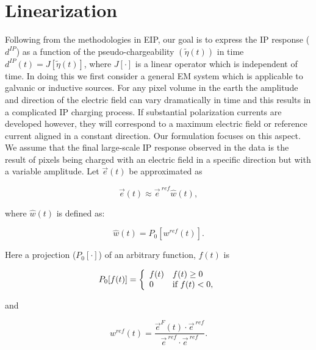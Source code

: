 \documentclass[extra,mreferee]{gji}
\newcommand {\e}  { {\vec e} }
\newcommand{\peta}{\tilde{\eta}}
\newcommand{\eref}{\e^{\ ref}}
\newcommand{\dip}{d^{IP}}
\begin{document}
\section{Linearization}
Following from the methodologies in EIP, our goal is to express the IP response ($\dip$) as a function of the pseudo-chargeability $(\peta(t))$ in time  $\dip(t) = J[\peta(t)]$, where $J[\cdot]$ is a linear operator which is independent of time. In doing this we first consider a general EM system which is applicable to galvanic or inductive sources. 
For any pixel  volume in the earth the amplitude and direction of the  electric field can vary dramatically  in time and this results in a complicated  IP charging process. If substantial polarization currents are developed however, they will correspond to a maximum electric field or reference current aligned in a constant direction. Our formulation focuses on this aspect. We assume that the final large-scale IP response observed in the data is the result of  pixels being charged with an electric field in a specific direction but with a variable amplitude. Let $\e(t)$ be approximated as
\begin{linenomath*}
\begin{equation}
  \e(t) \approx \eref \hat{w}(t),
  \label{eq: e_with_eref}
\end{equation}
\end{linenomath*}
where $\hat{w}(t)$ is defined as:
\begin{linenomath*}
\begin{equation}
  \hat{w}(t) = P_0[w^{ref}(t)].
  \label{eq: we}
\end{equation}
\end{linenomath*}
Here a projection ($P_0[\cdot]$) of an arbitrary function, $f(t)$ is
\begin{linenomath*}
\begin{equation}
  P_0[f(t)] = \left\{ 
  \begin{array}{l l}
    f(t) & f(t) \ge 0 \\
    0 & \text{if } f(t) < 0, 
  \end{array}\right.
  \label{eq: P0}
\end{equation}
\end{linenomath*}
and
\begin{linenomath*}
\begin{equation}
  w^{ref}(t) = \frac{\e^F(t)\cdot\eref}{\eref\cdot\eref}.
  \label{eq: wref}
\end{equation}
\end{linenomath*}
\end{document}
